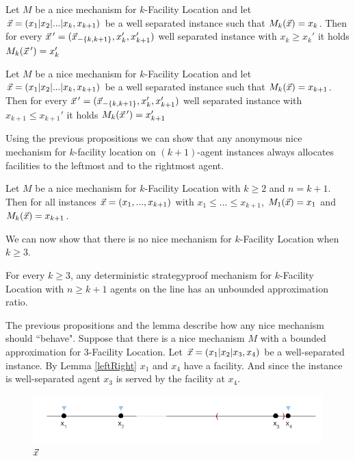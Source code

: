 \begin{proposition}
Let $M$ be a nice mechanism for $k$-Facility Location and let  $\vec{x} = (x_1|x_2|...|x_k,x_{k+1})$ be a well separated instance such that $M_k(\vec{x}) = x_k$. Then for every $\vec{x}\,' = (\vec{x}_{-\{k,k+1\}},x_k',x_{k+1}')$ well separated instance with $x_k \ge x_k'$ it holds $M_k(\vec{x}\,') = x_k'$
\end{proposition}


\begin{proposition} \label{left}
Let $M$ be a nice mechanism for $k$-Facility Location and let  $\vec{x} = (x_1|x_2|...|x_k,x_{k+1})$ be a well separated instance such that $M_k(\vec{x}) = x_{k+1}$. Then for every $\vec{x}\,' = (\vec{x}_{-\{k,k+1\}},x_k',x_{k+1}')$ well separated instance with $x_{k+1} \le x_{k+1}'$ it holds $M_k(\vec{x}\,') = x_{k+1}'$
\end{proposition}

Using the previous propositions we can show that any anonymous nice mechanism for $k$-facility location on $(k+1)$-agent instances always allocates facilities to the leftmost and to the rightmost agent.

\begin{lemma}\label{leftRight}
Let $M$ be a nice mechanism for $k$-Facility Location with $k\ge2$ and $n=k+1$. Then for all instances $\vec{x}=(x_1,...,x_{k+1})$ with $x_1\le...\le x_{k+1}$, $M_1(\vec{x}) = x_1$ and $M_k(\vec{x})=x_{k+1}$.
\end{lemma}

We can now show that there is no nice mechanism for $k$-Facility Location when $k\ge3$.

\begin{theorem}
For every $k\ge3$, any deterministic strategyproof mechanism for $k$-Facility Location with $n\ge k+1$ agents on the line has an unbounded approximation ratio. 
\end{theorem}
The previous propositions and the lemma describe how any nice mechanism should ``behave". Suppose that there is a nice mechanism $M$ with a bounded approximation for 3-Facility Location. Let  $\vec{x}=(x_1|x_2|x_3,x_4)$ be a well-separated instance. By Lemma \ref{leftRight} $x_1$ and $x_4$ have a facility. And since the instance is well-separated agent $x_3$ is served by the facility at $x_4$. 
\begin{figure}[ht]
    \centering
    \includegraphics[width=12cm]{Images/imposibility1.png}
    \caption{$\vec{x}$}
    \label{fig:imp1}
\end{figure}

